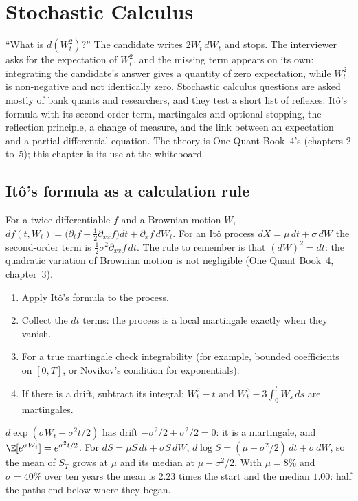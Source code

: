 \chapter{Stochastic Calculus}\label{ch:iv:stochastic-calculus}

``What is $d(W_t^2)$?'' The candidate writes $2W_t\,dW_t$ and stops. The interviewer asks for the expectation of
$W_t^2$, and the missing term appears on its own: integrating the candidate's answer gives a quantity of zero
expectation, while $W_t^2$ is non-negative and not identically zero. Stochastic calculus questions are asked mostly of
bank quants and researchers, and they test a short list of reflexes: Itô's formula with its second-order term,
martingales and optional stopping, the reflection principle, a change of measure, and the link between an expectation
and a partial differential equation. The theory is One Quant Book~4's (chapters 2 to~5); this chapter is its use at
the whiteboard.

\section{Itô's formula as a calculation rule}

For a twice differentiable $f$ and a Brownian motion $W$, $df(t, W_t) = \big(\partial_t f + \tfrac12\partial_{xx} f\big)dt
+ \partial_x f\,dW_t$. For an Itô process $dX = \mu\,dt + \sigma\,dW$ the second-order term is $\tfrac12\sigma^2
\partial_{xx} f\,dt$. The rule to remember is that $(dW)^2 = dt$: the quadratic variation of Brownian motion is not
negligible (One Quant Book~4, chapter~3).

\begin{method}[Is it a martingale?]\label{met:iv:stochastic-calculus:martingale}
\begin{enumerate}
\item Apply Itô's formula to the process.
\item Collect the $dt$ terms: the process is a local martingale exactly when they vanish.
\item For a true martingale check integrability (for example, bounded coefficients on $[0,T]$, or Novikov's condition
for exponentials).
\item If there is a drift, subtract its integral: $W_t^2 - t$ and $W_t^3 - 3\int_0^t W_s\,ds$ are martingales.
\end{enumerate}
\end{method}

\begin{example}\label{ex:iv:stochastic-calculus:exp}
$d\exp(\sigma W_t - \sigma^2 t/2)$ has drift $-\sigma^2/2 + \sigma^2/2 = 0$: it is a martingale, and $\E[e^{\sigma W_t}] =
e^{\sigma^2 t/2}$. For $dS = \mu S\,dt + \sigma S\,dW$, $d\log S = (\mu - \sigma^2/2)\,dt + \sigma\,dW$, so the mean of $S_T$
grows at $\mu$ and its median at $\mu - \sigma^2/2$. With $\mu = 8\%$ and $\sigma = 40\%$ over ten years the mean is $2.23$
times the start and the median $1.00$: half the paths end below where they began.
\end{example}

